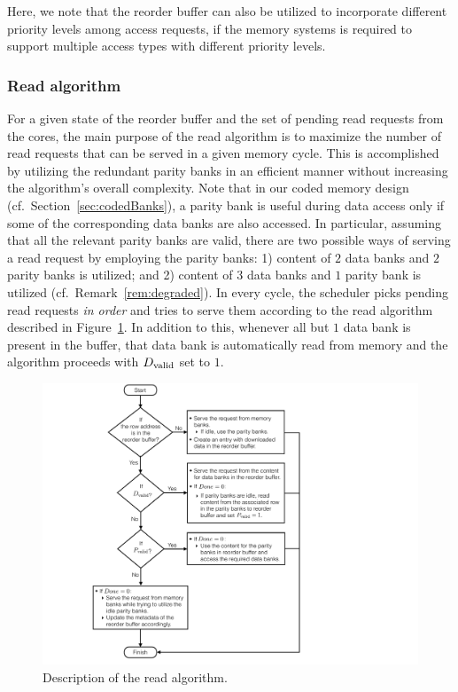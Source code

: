 \begin{remark}
\label{rem:priority}
Here, we note that the reorder buffer can also be utilized to incorporate different priority levels among access requests, if the memory systems is required to support multiple access types with different priority levels.
\end{remark}


\subsubsection{Read algorithm}
\label{sec:read}

For a given state of the reorder buffer and the set of pending read requests from the cores, the main purpose of the read algorithm is to maximize the number of read requests that can be served in a given memory cycle. This is accomplished by utilizing the redundant parity banks in an efficient manner without increasing the algorithm's overall complexity. Note that in our coded memory design (cf.~Section~\ref{sec:codedBanks}), a parity bank is useful during data access only if some of the corresponding data banks are also accessed. In particular, assuming that all the relevant parity banks are valid, there are two possible ways of serving a read request by employing the parity banks: 1) content of $2$ data banks and $2$ parity banks is utilized; and  2) content of $3$ data banks and $1$ parity bank is utilized (cf.~Remark~\ref{rem:degraded}). In every cycle, the scheduler picks pending read requests {\em in order} and tries to serve them according to the read algorithm described in Figure~\ref{fig:read}. In addition to this, whenever all but $1$ data bank is present in the buffer, that data bank is automatically read from memory and the algorithm proceeds with $D_{\rm valid}$ set to $1$. 
\begin{figure}[h!] \centering
\includegraphics[width=0.85\linewidth]{figures/Read-algo-new.pdf} 
\caption{Description of the read algorithm.}

\label{fig:read}
\end{figure}
